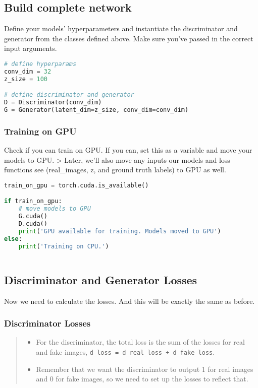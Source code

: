 \subsection{Build complete network}

Define your models' hyperparameters and instantiate the discriminator
and generator from the classes defined above. Make sure you've passed in
the correct input arguments.

\begin{lstlisting}[language=Python]
# define hyperparams
conv_dim = 32
z_size = 100

# define discriminator and generator
D = Discriminator(conv_dim)
G = Generator(latent_dim=z_size, conv_dim=conv_dim)
\end{lstlisting}

\subsubsection{Training on GPU}

Check if you can train on GPU. If you can, set this as a variable and
move your models to GPU. \textgreater{} Later, we'll also move any
inputs our models and loss functions see (real\_images, z, and ground
truth labels) to GPU as well.

\begin{lstlisting}[language=Python]
train_on_gpu = torch.cuda.is_available()

if train_on_gpu:
    # move models to GPU
    G.cuda()
    D.cuda()
    print('GPU available for training. Models moved to GPU')
else:
    print('Training on CPU.')
    
\end{lstlisting}

\subsection{Discriminator and Generator Losses}

Now we need to calculate the losses. And this will be exactly the same
as before.

\subsubsection{Discriminator Losses}

\begin{quote}
\begin{itemize}
\item For the discriminator, the total loss is the sum of the losses for real and fake images,  \lstinline{d_loss = d_real_loss + d_fake_loss}.
\item Remember that we want the discriminator to output 1 for real images and 0 for fake images, so we need to set up the losses to reflect that.
\end{itemize}
\end{quote}

